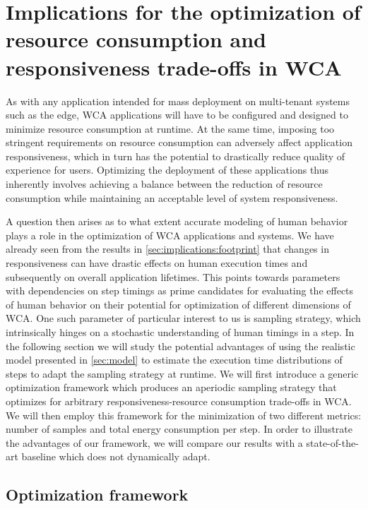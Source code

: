 \section{Implications for the optimization of resource consumption and responsiveness trade-offs in \ac{WCA}}\label{sec:implications:optimization}

As with any application intended for mass deployment on multi-tenant systems such as the edge, \ac{WCA} applications will have to be configured and designed to minimize resource consumption at runtime.
At the same time, imposing too stringent requirements on resource consumption can adversely affect application responsiveness, which in turn has the potential to drastically reduce quality of experience for users.
Optimizing the deployment of these applications thus inherently involves achieving a balance between the reduction of resource consumption while maintaining an acceptable level of system responsiveness.

A question then arises as to what extent accurate modeling of human behavior plays a role in the optimization of \ac{WCA} applications and systems.
We have already seen from the results in \cref{sec:implications:footprint} that changes in responsiveness can have drastic effects on human execution times and subsequently on overall application lifetimes.
This points towards parameters with dependencies on step timings as prime candidates for evaluating the effects of human behavior on their potential for optimization of different dimensions of \ac{WCA}.
One such parameter of particular interest to us is sampling strategy, which intrinsically hinges on a stochastic understanding of human timings in a step.
In the following section we will study the potential advantages of using the realistic model presented in \cref{sec:model} to estimate the execution time distributions of steps to adapt the sampling strategy at runtime.
We will first introduce a generic optimization framework which produces an aperiodic sampling strategy that optimizes for arbitrary responsiveness-resource consumption trade-offs in \ac{WCA}.
We will then employ this framework for the minimization of two different metrics: number of samples and total energy consumption per step.
In order to illustrate the advantages of our framework, we will compare our results with a state-of-the-art baseline which does not dynamically adapt.

\subsection{Optimization framework}\label{ssec:optframework}

